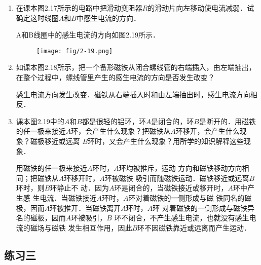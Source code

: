 \begin{enumerate}
  \item 在课本图2.17所示的电路中把滑动变阻器$R$的滑动片向左移动使电流减弱．试确定这时线圈$A$和$B$中感生电流的方向．

  \begin{solution}
    A和B线圈中的感生电流的方向如图2.19所示．
\begin{figure}[htp]\centering
\texttt{[image: fig/2-19.png]}
\caption{}
\end{figure}  
  \end{solution}
  
  \item 如课本图2.18所示，把一个备形磁铁从闭合螺线管的右端插入，由左端抽出，在整个过程中，螺线管里产生的感生电流的方向是否发生改变？

\begin{solution}
    感生电流方向发生改变．磁铁从右端插入时和由左端抽出时，感生电流方向相反．
\end{solution}



  \item 课本图2.19中的$A$和$B$都是很轻的铝环，环$A$是闭合的，环$B$是断开的．用磁铁的任一极来接近$A$环，会产生什么现象？把磁铁从$A$环移开，会产生什么现象？磁极移近或远离
  $B$环时，又会产生什么现象？用所学的知识解释这些现象．

  \begin{solution}
用磁铁的任一极来接近$A$环时，$A$环均被推斥，运动
方向和磁铁移动方向相同；把磁铁从$A$环移开时，$A$环被磁铁
吸引而随磁铁运动．磁铁移近或远离$B$环时，则$B$环静止不
动．因为$A$环是闭合的，当磁铁接近或移开时，$A$环中产生感
生电流．当磁铁接近$A$环时，$A$环对着磁铁的一侧形成与磁
铁同名的磁极，因而$A$环被推开．当磁铁离开$A$环时，$A$环
对着磁铁的一侧形成与磁铁异名的磁极，因而$A$环被吸引，$B$
环不闭合，不产生感生电流，也就没有感生电流的磁场与磁铁
发生相互作用，因此$B$环不因磁铁靠近或远离而产生运动．
\end{solution}
\end{enumerate}



\subsection{练习三}

